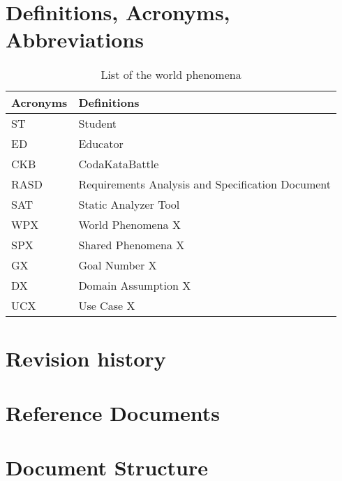 \section{Definitions, Acronyms, Abbreviations}
\label{s:Definitions_Acronyms_Abbreviations}%

\begin{table}[H]
  \begin{tabular}{|l|l|}

    \hline
    \textbf{Acronyms} & \textbf{Definitions}      \\
    \hline
    ST & Student \\
    \hline
    ED & Educator \\
    \hline
    CKB & CodaKataBattle \\
    \hline
    RASD & Requirements Analysis and Specification Document     \\
    \hline
    SAT & Static Analyzer Tool    \\
    \hline
    WPX & World Phenomena X    \\
    \hline
    SPX & Shared Phenomena X    \\
    \hline
    GX & Goal Number X    \\
    \hline
    DX & Domain Assumption X    \\
    \hline
    UCX & Use Case X    \\
    \hline
  \end{tabular}
  \caption{List of the world phenomena}
  \label{tab:definitions}
\end{table}

\section{Revision history}
\label{s:Revision_history}%


\section{Reference Documents}
\label{s:Reference_documents}%

\section{Document Structure}
\label{s:Document_Structure}%

